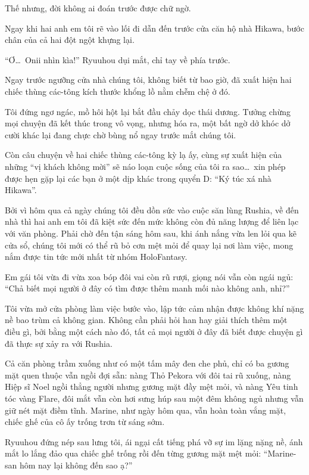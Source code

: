 \documentclass[../main.tex]{subfiles}
\begin{document}
Thế nhưng, đời không ai đoán trước được chữ ngờ.

Ngay khi hai anh em tôi rẽ vào lối đi dẫn đến trước cửa căn hộ nhà Hikawa, bước chân của cả hai đột ngột khựng lại.

``Ơ\dots\ Onii nhìn kìa!'' Ryuuhou dụi mắt, chỉ tay về phía trước.

Ngay trước ngưỡng cửa nhà chúng tôi, không biết từ bao giờ, đã xuất hiện hai chiếc thùng các-tông kích thước khổng lồ nằm chễm chệ ở đó.

Tôi đứng ngơ ngác, mồ hôi hột lại bắt đầu chảy dọc thái dương. Tưởng chừng mọi chuyện đã kết thúc trong vô vọng, nhưng hóa ra, một bất ngờ dở khóc dở cười khác lại đang chực chờ bùng nổ ngay trước mắt chúng tôi.

Còn câu chuyện về hai chiếc thùng các-tông kỳ lạ ấy, cùng sự xuất hiện của những ``vị khách không mời'' sẽ náo loạn cuộc sống của tôi ra sao\dots\ xin phép được hẹn gặp lại các bạn ở một dịp khác trong quyển D: ``Ký túc xá nhà Hikawa''.

\omk

Bởi vì hôm qua cả ngày chúng tôi đều dồn sức vào cuộc săn lùng Rushia, về đến nhà thì hai anh em tôi đã kiệt sức đến mức không còn đủ năng lượng để liên lạc với văn phòng. Phải chờ đến tận sáng hôm sau, khi ánh nắng vừa len lỏi qua kẽ cửa sổ, chúng tôi mới có thể rũ bỏ cơn mệt mỏi để quay lại nơi làm việc, mong nắm được tin tức mới nhất từ nhóm HoloFantasy.

Em gái tôi vừa đi vừa xoa bóp đôi vai còn rũ rượi, giọng nói vẫn còn ngái ngủ: ``Chả biết mọi người ở đây có tìm được thêm manh mối nào không anh, nhỉ?''

Tôi vừa mở cửa phòng làm việc bước vào, lập tức cảm nhận được không khí nặng nề bao trùm cả không gian. Không cần phải hỏi han hay giải thích thêm một điều gì, bởi bằng một cách nào đó, tất cả mọi người ở đây đã biết được chuyện gì đã thực sự xảy ra với Rushia.

Cả căn phòng trầm xuống như có một tấm mây đen che phủ, chỉ có ba gương mặt quen thuộc vẫn ngồi đợi sẵn: nàng Thỏ Pekora với đôi tai rũ xuống, nàng Hiệp sĩ Noel ngồi thẳng người nhưng gương mặt đầy mệt mỏi, và nàng Yêu tinh tóc vàng Flare, đôi mắt vẫn còn hơi sưng húp sau một đêm không ngủ nhưng vẫn giữ nét mặt điềm tĩnh. Marine, như ngày hôm qua, vẫn hoàn toàn vắng mặt, chiếc ghế của cô ấy trống trơn từ sáng sớm.

Ryuuhou đứng nép sau lưng tôi, ái ngại cất tiếng phá vỡ sự im lặng nặng nề, ánh mắt lo lắng đảo qua chiếc ghế trống rồi đến từng gương mặt mệt mỏi: ``Marine-san hôm nay lại không đến sao ạ?''
\end{document}
